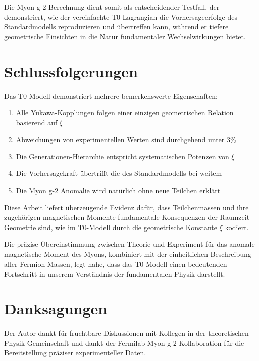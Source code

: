\documentclass[12pt,a4paper]{article}
\newcommand{\xipar}{\xi}
\begin{document}
	Die Myon g-2 Berechnung dient somit als entscheidender Testfall, der demonstriert, wie der vereinfachte T0-Lagrangian die Vorhersageerfolge des Standardmodells reproduzieren und übertreffen kann, während er tiefere geometrische Einsichten in die Natur fundamentaler Wechselwirkungen bietet.
	
	\section{Schlussfolgerungen}
	
	Das T0-Modell demonstriert mehrere bemerkenswerte Eigenschaften:
	
	\begin{enumerate}
		\item Alle Yukawa-Kopplungen folgen einer einzigen geometrischen Relation basierend auf $\xipar$
		\item Abweichungen von experimentellen Werten sind durchgehend unter 3\%
		\item Die Generationen-Hierarchie entspricht systematischen Potenzen von $\xipar$
		\item Die Vorhersagekraft übertrifft die des Standardmodells bei weitem
		\item Die Myon g-2 Anomalie wird natürlich ohne neue Teilchen erklärt
	\end{enumerate}
	
	\begin{tcolorbox}[colback=green!5!white,colframe=green!75!black,title=Fundamentale Schlussfolgerung]
		Diese Arbeit liefert überzeugende Evidenz dafür, dass Teilchenmassen und ihre zugehörigen magnetischen Momente fundamentale Konsequenzen der Raumzeit-Geometrie sind, wie im T0-Modell durch die geometrische Konstante $\xipar$ kodiert.
	\end{tcolorbox}
	
	Die präzise Übereinstimmung zwischen Theorie und Experiment für das anomale magnetische Moment des Myons, kombiniert mit der einheitlichen Beschreibung aller Fermion-Massen, legt nahe, dass das T0-Modell einen bedeutenden Fortschritt in unserem Verständnis der fundamentalen Physik darstellt.
	
	\section{Danksagungen}
	
	Der Autor dankt für fruchtbare Diskussionen mit Kollegen in der theoretischen Physik-Gemeinschaft und dankt der Fermilab Myon g-2 Kollaboration für die Bereitstellung präziser experimenteller Daten.
	
\end{document}
